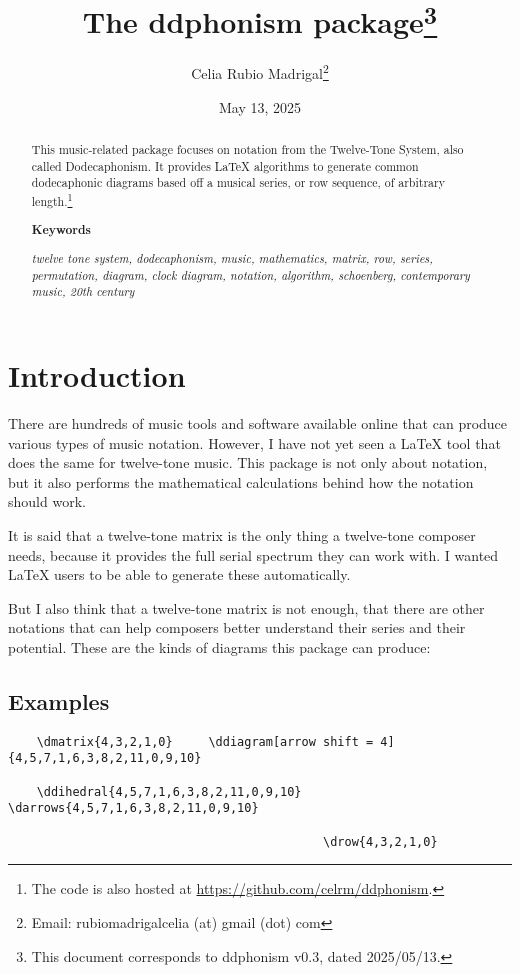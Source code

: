 \documentclass{article}
\title{The \textsf{ddphonism} package\footnote{This
		document corresponds to \textsf{ddphonism} v0.3, dated 2025/05/13.}}
\author{Celia Rubio Madrigal\footnote{Email: rubiomadrigalcelia (at) gmail (dot) com}}
\date{May 13, 2025}
\begin{document}
	
	\maketitle
	
	\begin{abstract}
		This music-related package focuses on notation from the Twelve-Tone System, also called Dodecaphonism. It provides \LaTeX{} algorithms to generate common dodecaphonic diagrams based off a musical series, or row sequence, of arbitrary length.\footnote{The code is also hosted at \url{https://github.com/celrm/ddphonism}.}
		
		\begin{center}
			\textbf{Keywords}
		\end{center}
	
		\textit{twelve tone system, dodecaphonism, music, mathematics, matrix, row, series, permutation, diagram, clock diagram, notation, algorithm, schoenberg, contemporary music, 20th century}
	\end{abstract}

	\tableofcontents

	\clearpage
	
	\section{Introduction}
	There are hundreds of music tools and software available online that can produce various types of music notation. However, I have not yet seen a \LaTeX{} tool that does the same for twelve-tone music. This package is not only about notation, but it also performs the mathematical calculations behind how the notation should work.
	
	It is said that a twelve-tone matrix is the only thing a twelve-tone composer needs, because it provides the full serial spectrum they can work with. I wanted \LaTeX{} users to be able to generate these automatically.

	But I also think that a twelve-tone matrix is not enough, that there are other notations that can help composers better understand their series and their potential. These are the kinds of diagrams this package can produce:

	\subsection{Examples}

	{\footnotesize\begin{verbatim}
	\dmatrix{4,3,2,1,0}     \ddiagram[arrow shift = 4]{4,5,7,1,6,3,8,2,11,0,9,10}

	\ddihedral{4,5,7,1,6,3,8,2,11,0,9,10}     \darrows{4,5,7,1,6,3,8,2,11,0,9,10}

											\drow{4,3,2,1,0}
	\end{verbatim}}
\end{document}
